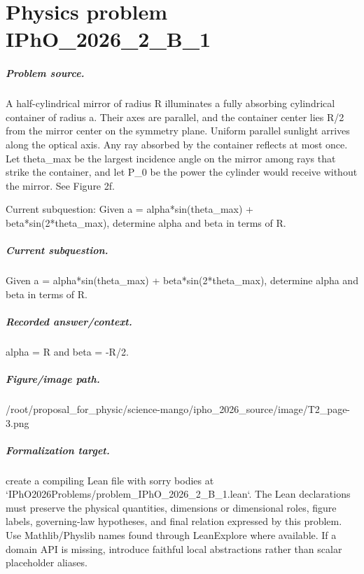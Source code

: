 
\chapter{Physics problem IPhO\_2026\_2\_B\_1}
\label{ch:IPhO2026Problems_problem_IPhO_2026_2_B_1}

\paragraph{Problem source.}
A half-cylindrical mirror of radius R illuminates a fully absorbing cylindrical
container of radius a.  Their axes are parallel, and the container center lies
R/2 from the mirror center on the symmetry plane.  Uniform parallel sunlight
arrives along the optical axis.  Any ray absorbed by the container reflects at
most once.  Let theta\_max be the largest incidence angle on the mirror among
rays that strike the container, and let P\_0 be the power the cylinder would
receive without the mirror.  See Figure 2f.

Current subquestion:
Given a = alpha*sin(theta\_max) + beta*sin(2*theta\_max), determine alpha and beta in terms of R.

\paragraph{Current subquestion.}
Given a = alpha*sin(theta\_max) + beta*sin(2*theta\_max), determine alpha and beta in terms of R.

\paragraph{Recorded answer/context.}
alpha = R and beta = -R/2.

\paragraph{Figure/image path.}
/root/proposal\_for\_physic/science-mango/ipho\_2026\_source/image/T2\_page-3.png

\paragraph{Formalization target.}
create a compiling Lean file with sorry bodies at `IPhO2026Problems/problem\_IPhO\_2026\_2\_B\_1.lean`.
The Lean declarations must preserve the physical quantities, dimensions or dimensional roles, figure labels, governing-law hypotheses, and final relation expressed by this problem.
Use Mathlib/Physlib names found through LeanExplore where available. If a domain API is missing, introduce faithful local abstractions rather than scalar placeholder aliases.


